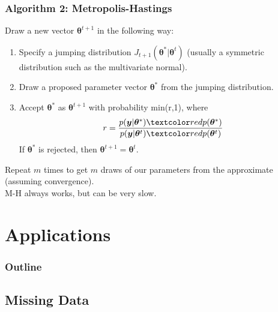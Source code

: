 \documentclass{beamer}
\begin{document}
\begin{frame}
\frametitle{Algorithm 2: Metropolis-Hastings}
\pause 
Draw a new vector $\bm{\theta}^{t+1}$ in the following way:
\pause
\begin{enumerate}
\item Specify a jumping distribution $J_{t+1}(\bm{\theta}^* |
\bm{\theta}^{t})$ \pause (usually a symmetric distribution such as the multivariate normal).
\pause
\item Draw a proposed parameter vector $\bm{\theta}^*$ from the jumping
distribution. 
\pause
\item Accept $\bm{\theta}^*$ as $\bm{\theta}^{t+1}$ with probability
min(r,1), where 
\pause
\begin{eqnarray*}
r = \frac{p(\bm{y}|\bm{\theta}^*) \red{p(\bm{\theta}^*)}}{p(\bm{y}|\bm{\theta}^{t}) \red{p(\bm{\theta}^{t})}}
\end{eqnarray*}
\pause
If $\bm{\theta}^*$ is rejected, then $\bm{\theta}^{t+1} = \bm{\theta}^t$.
\end{enumerate}
\pause
\bigskip
Repeat $m$ times to get $m$ draws of our parameters from the
approximate  (assuming convergence). \\
\pause
\bigskip
M-H always works, but can be very slow.\\
\end{frame}

\section{Applications}

\begin{frame}
\frametitle{Outline}
\tableofcontents[currentsection]
\end{frame}

\subsection{Missing Data}
\end{document}
